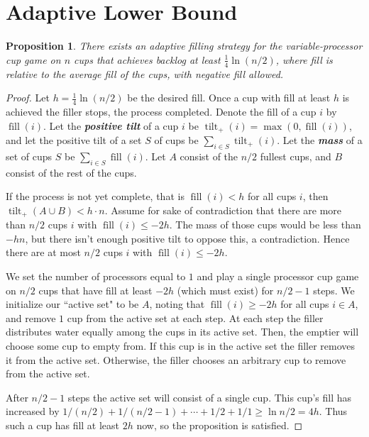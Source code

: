 \documentclass[twocolumn]{article}[11pt]
\newcommand{\defn}[1]{{\textit{\textbf{\boldmath #1}}}}
\DeclareMathOperator{\tilt}{\text{tilt}}
\DeclareMathOperator{\fil}{\text{fill}}
\newtheorem{proposition}{Proposition}
\begin{document}
\section{Adaptive Lower Bound}\label{sec:adaptive}
\begin{proposition}
\label{prop:adaptiveBase}
  There exists an adaptive filling strategy for the variable-processor cup game
  on $n$ cups that achieves backlog at least $\frac{1}{4}\ln (n/2)$, where fill
  is relative to the average fill of the cups, with negative fill allowed.
\end{proposition}
\begin{proof}
  Let $h = \frac{1}{4}\ln (n/2)$ be the desired fill. Once a cup with fill at
  least $h$ is achieved the filler stops, the process completed. Denote the
  fill of a cup $i$ by $\fil(i)$. Let the \defn{positive tilt} of a cup $i$ be
  $\tilt_+(i) = \max(0, \fil(i))$, and let the positive tilt of a set $S$ of
  cups be $\sum_{i\in S} \tilt_+(i)$. Let the \defn{mass} of a set of cups $S$
  be $\sum_{i\in S} \fil(i)$. Let $A$ consist of the $n/2$ fullest cups, and
  $B$ consist of the rest of the cups.

  If the process is not yet complete, that is $\fil(i) < h$ for all cups $i$,
  then $\tilt_+(A\cup B) < h\cdot n$. Assume for
  sake of contradiction that there are more than $n/2$ cups $i$ with $\fil(i)
  \le -2h$. The mass of those cups would be less than $-hn $, but there isn't
  enough positive tilt to oppose this, a contradiction. Hence there are at most
  $n/2$ cups $i$ with $\fil(i) \le -2h$. 

  We set the number of processors equal to $1$ and play a single processor cup
  game on $n/2$ cups that have fill at least $-2h$ (which must exist) for $n/2
  -1$ steps. We initialize our ``active set" to be $A$, noting that $\fil(i)
  \ge -2h$ for all cups $i\in A$, and remove $1$ cup from the active set at
  each step.
  At each step the filler distributes water equally among the cups in its
  active set. Then, the emptier will choose some cup to empty from. If this cup
  is in the active set the filler removes it from the active set. Otherwise, the
  filler chooses an arbitrary cup to remove from the active set.

  After $n/2-1$ steps the active set will consist of a single cup. This cup's
  fill has increased by $1/(n/2) + 1/(n/2 - 1) + \cdots + 1/2 + 1/1
  \ge \ln n/2 = 4h$. Thus such a cup has fill at least $2h$ now, so the
  proposition is satisfied.
\end{proof}
\end{document}
